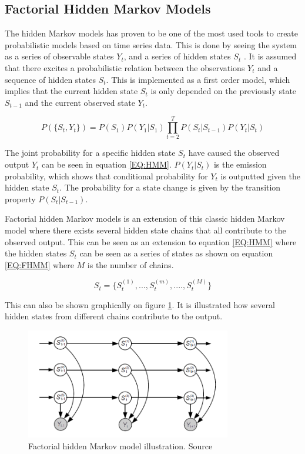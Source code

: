 \subsection{Factorial Hidden Markov Models}
The hidden Markov models has proven to be one of the most used tools to create probabilistic models based on time series data. This is done by seeing the system as a series of observable states $Y_t$, and a series of hidden states $S_t$ \citep{RefWorks:20}. It is assumed that there excites a probabilistic relation between the observations $Y_t$ and a sequence of hidden states $S_t$. This is implemented as a first order model, which implies that the current hidden state $S_t$ is only depended on the previously state $S_{t-1}$ and the current observed state $Y_t$.

\begin{equation}
	P(\{ S_t, Y_t \} ) = P(S_1)P(Y_1 | S_1) \prod_{t=2}^T P(S_t|S_{t-1})P(Y_t|S_t)
	\label{EQ:HMM}
\end{equation}

The joint probability for a specific hidden state $S_t$ have caused the observed output $Y_t$ can be seen in equation \ref{EQ:HMM}. $P(Y_t|S_t)$ is the emission probability, which shows that conditional probability for $Y_t$ is outputted given the hidden state $S_t$. The probability for a state change is given by the transition property $P(S_t|S_{t-1})$. 

Factorial hidden Markov models is an extension of this classic hidden Markov model where there exists several hidden state chains that all contribute to the observed output. This can be seen as an extension to equation \ref{EQ:HMM} where the hidden states $S_t$ can be seen as a series of states as shown on equation \ref{EQ:FHMM} where $M$ is the number of chains.

\begin{equation}
	S_t = \{ S_t^{(1)}, ..., S_t^{(m)}, ...., S_t^{(M)} \}
	\label{EQ:FHMM}
\end{equation}

This can also be shown graphically on figure \ref{fig:FHMM}. It is illustrated how several hidden states from different chains contribute to the output. 

\begin{figure}[H]
\centering
\includegraphics[width=0.8\textwidth]{billeder/FHMM.png}
\caption{Factorial hidden Markov model illustration. Source \citep{RefWorks:20}}
\label{fig:FHMM}
\end{figure}

